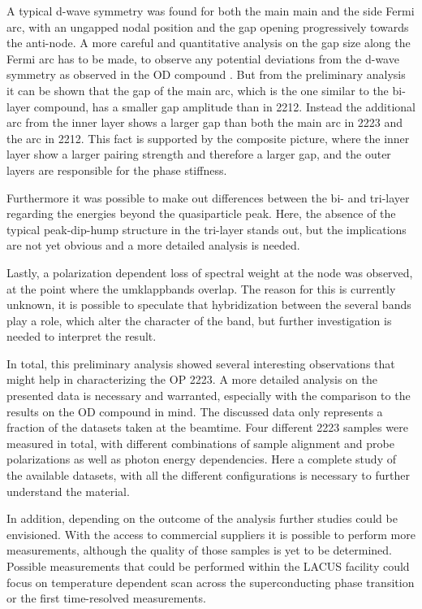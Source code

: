 A typical d-wave symmetry was found for both the main main and the side Fermi arc, with an ungapped nodal position and the gap opening progressively towards the anti-node.
A more careful and quantitative analysis on the gap size along the Fermi arc has to be made, to observe any potential deviations from the d-wave symmetry as observed in the OD compound \cite{luo_electronic_2023}.
But from the preliminary analysis it can be shown that the gap of the main arc, which is the one similar to the bi-layer compound, has a smaller gap amplitude than in 2212.
Instead the additional arc from the inner layer shows a larger gap than both the main arc in 2223 and the arc in 2212.
This fact is supported by the composite picture, where the inner layer show a larger pairing strength and therefore a larger gap, and the outer layers are responsible for the phase stiffness.

Furthermore it was possible to make out differences between the bi- and tri-layer regarding the energies beyond the quasiparticle peak.
Here, the absence of the typical peak-dip-hump structure in the tri-layer stands out, but the implications are not yet obvious and a more detailed analysis is needed.

Lastly, a polarization dependent loss of spectral weight at the node was observed, at the point where the umklappbands overlap.
The reason for this is currently unknown, it is possible to speculate that hybridization between the several bands play a role, which alter the character of the band, but further investigation is needed to interpret the result.

In total, this preliminary analysis showed several interesting observations that might help in characterizing the OP 2223.
A more detailed analysis on the presented data is necessary and warranted, especially with the comparison to the results on the OD compound in mind.
The discussed data only represents a fraction of the datasets taken at the beamtime.
Four different 2223 samples were measured in total, with different combinations of sample alignment and probe polarizations as well as photon energy dependencies.
Here a complete study of the available datasets, with all the different configurations is necessary to further understand the material.

In addition, depending on the outcome of the analysis further studies could be envisioned.
With the access to commercial suppliers it is possible to perform more measurements, although the quality of those samples is yet to be determined.
Possible measurements that could be performed within the LACUS facility could focus on temperature dependent scan across the superconducting phase transition or the first time-resolved measurements.